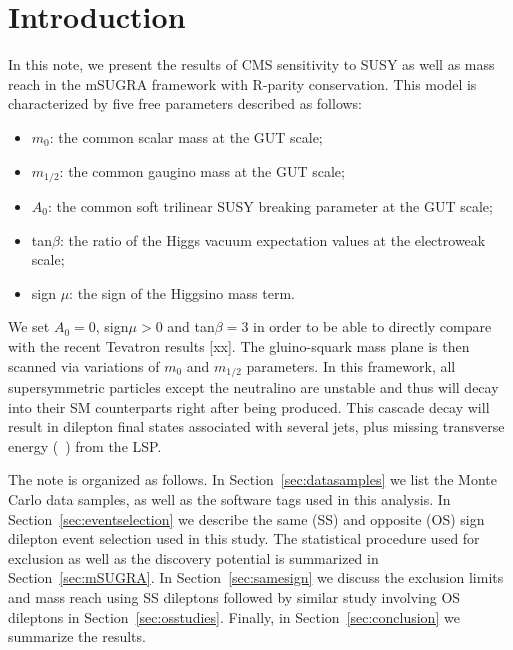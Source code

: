 \section{Introduction}
\label{sec:intro}

In this note, we present the results of CMS sensitivity to SUSY as well as mass reach
in the mSUGRA framework with R-parity conservation. This model is characterized by five
free parameters described as follows:

\begin{itemize}
\item $m_{0}$: the common scalar mass at the GUT scale;
\item $m_{1/2}$: the common gaugino mass at the GUT scale;
\item $A_{0}$: the common soft trilinear SUSY breaking parameter at the GUT scale;
\item tan$\beta$: the ratio of the Higgs vacuum expectation values at the electroweak scale;
\item sign $\mu$: the sign of the Higgsino mass term.
\end{itemize}

 We set $A_{0} = 0$, sign$\mu > 0$ and tan$\beta = 3$ in order to be able to directly
compare with the recent Tevatron results [xx]. The gluino-squark mass plane is then scanned 
via variations of $m_{0}$ and $m_{1/2}$ parameters. In this framework, all supersymmetric particles
except the neutralino are unstable and thus will decay into their SM counterparts right
after being produced. This cascade decay will result in dilepton final states associated 
with several jets, plus missing transverse energy (\met~) from the LSP.

The note is organized as follows. In Section~\ref{sec:datasamples} we list the Monte Carlo data samples, as well as the 
software tags used in this analysis. In Section~\ref{sec:eventselection} we describe the same (SS) and opposite (OS) sign 
dilepton event selection used in this study. The statistical procedure used for exclusion as well as 
the discovery potential is summarized in Section~\ref{sec:mSUGRA}. In Section~\ref{sec:samesign} we discuss the exclusion limits and
mass reach using SS dileptons followed by similar study involving OS dileptons in Section~\ref{sec:osstudies}. Finally, in 
Section~\ref{sec:conclusion} we summarize the results.


 



